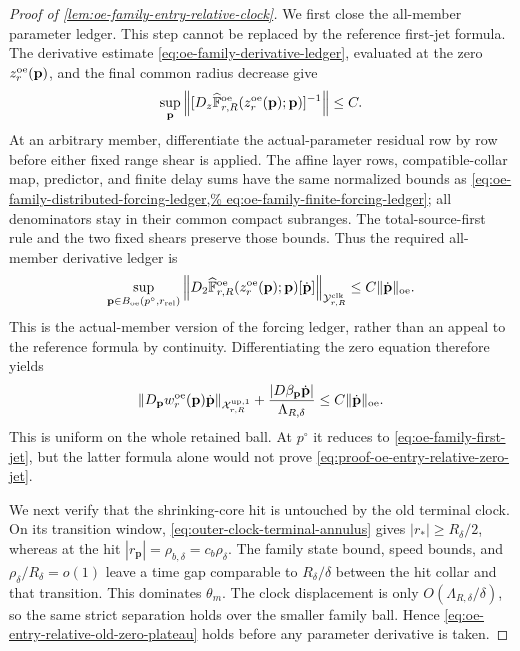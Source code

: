 \begin{proof}[Proof of
\cref{lem:oe-family-entry-relative-clock}]
We first close the all-member parameter ledger.  This step cannot be
replaced by the reference first-jet formula.  The derivative estimate
\cref{eq:oe-family-derivative-ledger}, evaluated at the zero
\(z_r^{\rm oe}(\mathbf p)\), and the final common radius decrease give
\begin{equation}
 \sup_{\mathbf p}
 \left\|
  [D_z\widehat{\mathbb F}_{r,R}^{\rm oe}
   (z_r^{\rm oe}(\mathbf p);\mathbf p)]^{-1}
 \right\|\le C.                                \label{eq:proof-oe-entry-relative-zero-inverse}
\end{equation}
At an arbitrary member, differentiate the actual-parameter residual row
by row before either fixed range shear is applied.  The affine layer
rows, compatible-collar map, predictor, and finite delay sums have the
same normalized bounds as
\cref{eq:oe-family-distributed-forcing-ledger,%
eq:oe-family-finite-forcing-ledger}; all denominators stay in their
common compact subranges.  The total-source-first rule and the two fixed
shears preserve those bounds.  Thus the required all-member derivative
ledger is
\begin{equation}
 \sup_{\mathbf p\in B_{\rm oe}(p^\circ,r_{\rm rel})}
 \left\|D_2
 \widehat{\mathbb F}_{r,R}^{\rm oe}
   (z_r^{\rm oe}(\mathbf p);\mathbf p)
       [\dot{\mathbf p}]\right\|_{\mathcal Y_{r,R}^{\rm clk}}
 \le C\|\dot{\mathbf p}\|_{\rm oe}.             \label{eq:proof-oe-entry-relative-all-member-external-jet}
\end{equation}
This is the actual-member version of the forcing ledger, rather than an
appeal to the reference formula by continuity.  Differentiating the zero
equation therefore yields
\begin{equation}
 \|D_{\mathbf p}w_r^{\rm oe}(\mathbf p)
       \dot{\mathbf p}\|_{\mathcal X_{r,R}^{\rm up,1}}
 +\frac{|D\beta_{\mathbf p}\dot{\mathbf p}|}
       {\Lambda_{R,\delta}}
 \le C\|\dot{\mathbf p}\|_{\rm oe}.             \label{eq:proof-oe-entry-relative-zero-jet}
\end{equation}
This is uniform on the whole retained ball.  At \(p^\circ\) it reduces
to \cref{eq:oe-family-first-jet}, but the latter formula alone would not
prove \cref{eq:proof-oe-entry-relative-zero-jet}.

We next verify that the shrinking-core hit is untouched by the old
terminal clock.  On its transition window,
\cref{eq:outer-clock-terminal-annulus} gives
\(|r_*|\ge R_\delta/2\), whereas at the hit
\(|r_{\mathbf p}|=\rho_{b,\delta}=c_b\rho_\delta\).
The family state bound, speed bounds, and
\(\rho_\delta/R_\delta=o(1)\) leave a time gap comparable to
\(R_\delta/\delta\) between the hit collar and that transition.  This
dominates \(\theta_m\).  The clock displacement is only
\(O(\Lambda_{R,\delta}/\delta)\), so the same strict separation holds
over the smaller family ball.  Hence
\cref{eq:oe-entry-relative-old-zero-plateau} holds before any parameter
derivative is taken.


\end{proof}
